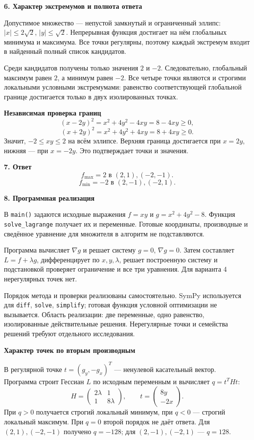 \documentclass[12pt,a4paper]{article}
\begin{document}
\textbf{6. Характер экстремумов и полнота ответа}

Допустимое множество --- непустой замкнутый и ограниченный эллипс:
$|x|\le2\sqrt2$, $|y|\le\sqrt2$. Непрерывная функция достигает на нём
глобальных минимума и максимума. Все точки регулярны, поэтому каждый
экстремум входит в найденный полный список кандидатов.

Среди кандидатов получены только значения $2$ и $-2$. Следовательно,
глобальный максимум равен $2$, а минимум равен $-2$. Все четыре точки
являются и строгими локальными условными экстремумами: равенство
соответствующей глобальной границе достигается только в двух изолированных точках.

\textbf{Независимая проверка границ}
\[(x-2y)^2=x^2+4y^2-4xy=8-4xy\ge0,\]
\[(x+2y)^2=x^2+4y^2+4xy=8+4xy\ge0.\]
Значит, $-2\le xy\le2$ на всём эллипсе. Верхняя граница достигается при
$x=2y$, нижняя --- при $x=-2y$. Это подтверждает точки и значения.

\textbf{7. Ответ}
\[\boxed{f_{\max}=2\text{ в }(2,1),(-2,-1).}\]
\[\boxed{f_{\min}=-2\text{ в }(2,-1),(-2,1).}\]

\newpage
\textbf{8. Программная реализация}

В \texttt{main()} задаются исходные выражения $f=xy$ и
$g=x^2+4y^2-8$. Функция \texttt{solve\_lagrange} получает их и переменные.
Готовые координаты, производные и сведённое уравнение для множителя
в алгоритм не подставляются.

Программа вычисляет $\nabla g$ и решает систему $g=0$, $\nabla g=0$.
Затем составляет $L=f+\lambda g$, дифференцирует по $x,y,\lambda$,
решает построенную систему и подстановкой проверяет ограничение и
все три уравнения. Для варианта 4 нерегулярных точек нет.

Порядок метода и проверки реализованы самостоятельно. SymPy используется
для \texttt{diff}, \texttt{solve}, \texttt{simplify}; готовая функция
условной оптимизации не вызывается. Область реализации: две переменные,
одно равенство, изолированные действительные решения. Нерегулярные точки
и семейства решений требуют отдельного исследования.

\textbf{Характер точек по вторым производным}

В регулярной точке $t=(g_y,-g_x)^T$ --- ненулевой касательный вектор.
Программа строит Гессиан $L$ по исходным переменным и вычисляет $q=t^THt$:
\[H=\begin{pmatrix}2\lambda&1\\1&8\lambda\end{pmatrix},
\qquad t=\begin{pmatrix}8y\\-2x\end{pmatrix}.\]
При $q>0$ получается строгий локальный минимум, при $q<0$ --- строгий
локальный максимум. При $q=0$ второй порядок не даёт ответа.
Для $(2,1),(-2,-1)$ получено $q=-128$; для $(2,-1),(-2,1)$ --- $q=128$.
\end{document}
